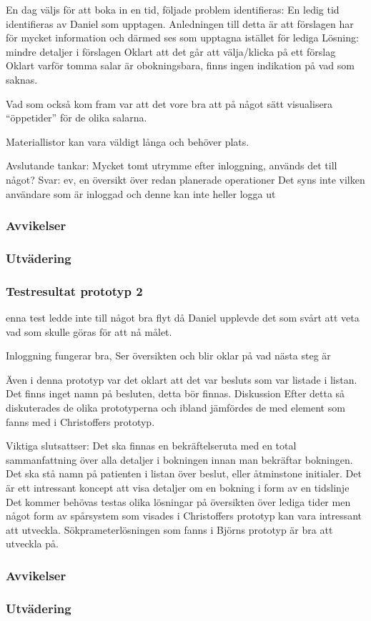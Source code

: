 \documentclass[a4paper,10pt]{article}
\begin{document}
En dag väljs för att boka in en tid, följade problem identifieras:
En ledig tid identifieras av Daniel som upptagen. Anledningen till detta är att förslagen har för mycket information och därmed ses som upptagna istället för lediga
Lösning: mindre detaljer i förslagen
Oklart att det går att välja/klicka på ett förslag
Oklart varför tomma salar är obokningsbara, finns ingen indikation på vad som saknas.

Vad som också kom fram var att det vore bra att på något sätt visualisera “öppetider” för de olika salarna.

Materiallistor kan vara väldigt långa och behöver plats.

Avslutande tankar:
Mycket tomt utrymme efter inloggning, används det till något?
Svar: ev, en översikt över redan planerade operationer
Det syns inte vilken användare som är inloggad och denne kan inte heller logga ut


\subsubsection{Avvikelser}
\subsubsection{Utvädering}
\subsubsection{Testresultat prototyp 2}
enna test ledde inte till något bra flyt då Daniel upplevde det som svårt att veta vad som skulle göras för att nå målet.

Inloggning fungerar bra,
Ser översikten och blir oklar på vad nästa steg är

Även i denna prototyp var det oklart att det var besluts som var listade i listan.
Det finns inget namn på besluten, detta bör finnas.
Diskussion
Efter detta så diskuterades de olika prototyperna och ibland jämfördes de med element som fanns med i Christoffers prototyp.

Viktiga slutsattser:
Det ska finnas en bekräftelseruta med en total sammanfattning över alla detaljer i bokningen innan man bekräftar bokningen.
Det ska stå namn på patienten i listan över beslut, eller åtminstone initialer.
Det är ett intressant koncept att visa detaljer om en bokning i form av en tidslinje
Det kommer behövas testas olika lösningar på översikten över lediga tider men något form av spårsystem som visades i Christoffers prototyp kan vara intressant att utveckla.
Sökprameterlösningen som fanns i Björns prototyp är bra att utveckla på.

\subsubsection{Avvikelser}
\subsubsection{Utvädering}
\end{document}
